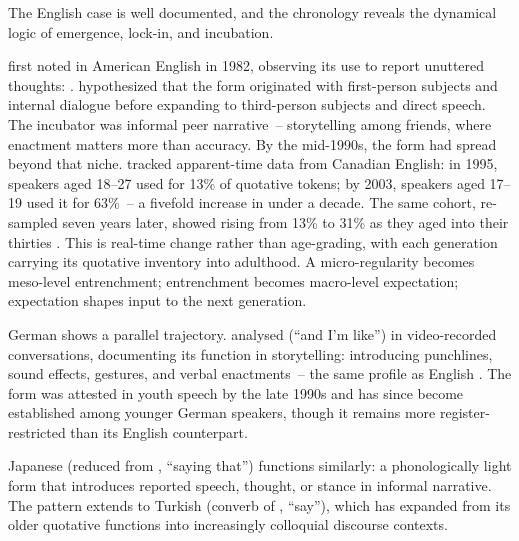 The English case is well documented, and the chronology reveals the dynamical logic of emergence, lock-in, and incubation.

\textcite{butters1982} first noted  in American English in 1982, observing its use to report unuttered thoughts: . \textcite{ferrarabell1995} hypothesized that the form originated with first-person subjects and internal dialogue before expanding to third-person subjects and direct speech. The incubator was informal peer narrative~-- storytelling among friends, where enactment matters more than accuracy. By the mid-1990s, the form had spread beyond that niche. \textcite{tagliamontedarcy2004} tracked apparent-time data from Canadian English: in 1995, speakers aged 18--27 used  for 13\% of quotative tokens; by 2003, speakers aged 17--19 used it for 63\%~-- a fivefold increase in under a decade. The same cohort, re-sampled seven years later, showed  rising from 13\% to 31\% as they aged into their thirties \autocite{tagliamontedarcy2007}. This is real-time change rather than age-grading, with each generation carrying its quotative inventory into adulthood. A micro-regularity becomes meso-level entrenchment; entrenchment becomes macro-level expectation; expectation shapes input to the next generation.

German shows a parallel trajectory. \textcite{golato2000} analysed  (\enquote{and I'm like}) in video-recorded conversations, documenting its function in storytelling: introducing punchlines, sound effects, gestures, and verbal enactments~-- the same profile as English . The form was attested in youth speech by the late 1990s \autocite{androutsopoulos1998} and has since become established among younger German speakers, though it remains more register-restricted than its English counterpart.

Japanese  (reduced from , \enquote{saying that}) functions similarly: a phonologically light form that introduces reported speech, thought, or stance in informal narrative. The pattern extends to Turkish  (converb of , \enquote{say}), which has expanded from its older quotative functions into increasingly colloquial discourse contexts.

